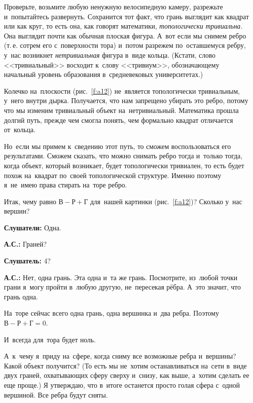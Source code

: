 Проверьте, возьмите любую ненужную велосипедную камеру, разрежьте и~попытайтесь развернуть.
Сохранится тот факт, что грань выглядит как квадрат или как круг, то есть она, как говорят
математики, \textit{топологически тривиальна}.
 Она выглядит почти как обычная плоская фигура. А~вот если мы
снимем ребро (т.\,е. сотрем его с~поверхности тора) и~потом разрежем по~оставшемуся ребру, у~нас
возникнет \textit{нетривиальная} фигура в~виде кольца. (Кстати, слово <<тривиальный>> восходит к~слову
<<тривиум>>, обозначающему начальный уровень образования в~средневековых университетах.)


Колечко на~плоскости (рис.~\ref{f:a12}) не~является топологически тривиальным, у~него внутри дырка.
Получается, что нам запрещено убирать это ребро, потому что мы изменим тривиальный объект
на~нетривиальный. Математика прошла долгий путь, прежде чем смогла понять, чем формально квадрат
отличается от~кольца.



\pagebreak

Но~если мы примем к~сведению этот путь, то сможем воспользоваться его результатами. Сможем сказать,
что можно снимать ребро тогда и~только тогда, когда объект, который возникает, будет топологически
тривиален, то есть будет похож на~квадрат по~своей топологической структуре. Именно поэтому
я~не~имею права стирать на~торе ребро.

Итак, чему равно $\text{В}-\text{Р}+\text{Г}$ для~нашей картинки (рис.~\ref{f:a12})? Сколько у~нас вершин?

\textbf{Слушатели:} Одна.

\textbf{А.С.:} Граней?

\textbf{Слушатель:} 4?

\textbf{А.С.:} Нет, одна грань. Эта одна и~та же грань. Посмотрите, из~любой точки грани я~могу
пройти в~любую другую, не~пересекая рёбра. А~это значит, что грань одна.

На~торе сейчас всего одна грань, одна вершинка и~два ребра. Поэтому $\text{В}-\text{Р}+\text{Г}=0$.

И~всегда для~тора будет ноль.

А~к~чему я~приду на~сфере, когда сниму все возможные ребра и~вершины? Какой объект получится? (То
есть мы не~хотим останавливаться на~сети в~виде двух граней, охватывающих сферу сверху и~снизу, как
выше, а~хотим сделать ее еще проще.) Я утверждаю, что в~итоге останется просто голая сфера с~одной вершиной.
 Все ребра будут сняты.

